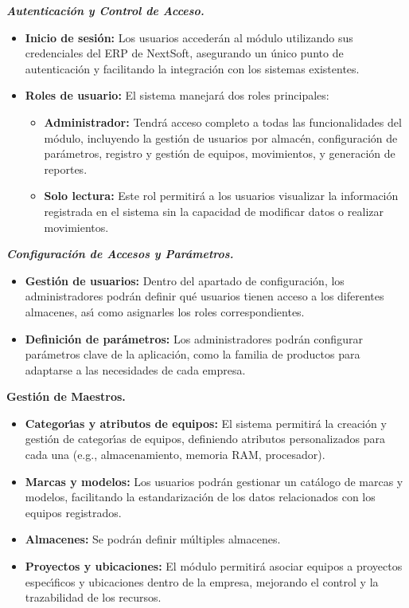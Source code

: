 \documentclass[stu, 12pt, letterpaper, donotrepeattitle, floatsintext, natbib]{apa7}
\begin{document}
\textit{\textbf{Autenticaci\'on y Control de Acceso.}}
\begin{itemize}
    \item\textbf{Inicio de sesi\'on: }Los usuarios acceder\'an al m\'odulo utilizando sus credenciales del ERP de NextSoft, asegurando un \'unico punto de
          autenticaci\'on y facilitando la integraci\'on con los sistemas existentes.
    \item\textbf{Roles de usuario: }El sistema manejar\'a dos roles principales:
          \begin{itemize}
              \item\textbf{Administrador: }Tendr\'a acceso completo a todas las funcionalidades del m\'odulo, incluyendo la gesti\'on de usuarios por almac\'en,
                    configuraci\'on de par\'ametros, registro y gesti\'on de equipos, movimientos, y generaci\'on de reportes.
              \item\textbf{Solo lectura: }Este rol permitir\'a a los usuarios visualizar la informaci\'on registrada en el sistema sin la capacidad de modificar datos
                    o realizar movimientos.
          \end{itemize}
\end{itemize}

\textit{\textbf{Configuraci\'on de Accesos y Par\'ametros.}}
\begin{itemize}
    \item\textbf{Gesti\'on de usuarios: }Dentro del apartado de configuraci\'on, los administradores podr\'an definir qu\'e usuarios tienen acceso a los diferentes
          almacenes, as\'{\i} como asignarles los roles correspondientes.
    \item\textbf{Definici\'on de par\'ametros: }Los administradores podr\'an configurar par\'ametros clave de la aplicaci\'on, como la familia de productos para
          adaptarse a las necesidades de cada empresa.
\end{itemize}

\textbf{Gesti\'on de Maestros.}
\begin{itemize}
    \item\textbf{Categor\'{\i}as y atributos de equipos: }El sistema permitir\'a la creaci\'on y gesti\'on de categor\'{\i}as de equipos, definiendo atributos
          personalizados para cada una (e.g., almacenamiento, memoria RAM, procesador).
    \item\textbf{Marcas y modelos: }Los usuarios podr\'an gestionar un cat\'alogo de marcas y modelos, facilitando la estandarizaci\'on de los datos relacionados con
          los equipos registrados.
    \item\textbf{Almacenes: }Se podr\'an definir m\'ultiples almacenes.
    \item\textbf{Proyectos y ubicaciones: }El m\'odulo permitir\'a asociar equipos a proyectos espec\'{\i}ficos y ubicaciones dentro de la empresa, mejorando el control
          y la trazabilidad de los recursos.
\end{itemize}
\end{document}
